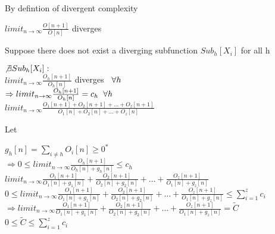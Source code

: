 \documentclass[11pt]{article}
\begin{document}
\vspace{8mm}
By defintion of divergent complexity
\begin{center}
\vspace{1mm}
$
limit_{n \rightarrow \infty} \frac{O[n+1]}{O[n]}$  diverges
\end{center}
\vspace{6mm}
Suppose there does not exist a diverging subfunction $Sub_h[X_i]$ for all h
\begin{center}
$
\not \exists Sub_h[X_i]:
$
\\ \vspace{2mm}
$
limit_{n \rightarrow \infty} \frac{O_h[n+1]}{O_h[n]}$ diverges $\hspace{2mm} \forall h$
\\ \vspace{2mm}
$
\Rightarrow limit_{n \rightarrow \infty} \frac{O_h[n+1]}{O_h[n]} = c_h \hspace{2mm} \forall h
$
\\ \vspace{2mm}
$
limit_{n \rightarrow \infty} \frac{O_{1}[n+1] + O_{2}[n+1] + ... + O_{z}[n+1]}{O_{1}[n] + O_{2}[n] + ... + O_{z}[n]}
$
\end{center}
\vspace{4mm}
Let
\begin{center}
$
g_h[n] = \sum_{i \neq h} O_i[n] \geq 0^*
$
\\ \vspace{2mm}
$
\Rightarrow0 \leq limit_{n \rightarrow \infty} \frac{O_h[n+1]}{O_h[n] + g_h[n]} \leq c_h
$
\\ \vspace{2mm}
$
limit_{n \rightarrow \infty} \frac{O_{1}[n+1]}{O_1[n] + g_1[n]} + \frac{O_{2}[n+1]}{O_2[n] + g_2[n]} +  ... + \frac{O_{z}[n+1]}{O_{1}[n] + g_z[n]}
$
\\ \vspace{2mm}
$
0 \leq limit_{n \rightarrow \infty} \frac{O_{1}[n+1]}{O_1[n] + g_1[n]} + \frac{O_{2}[n+1]}{O_2[n] + g_2[n]} +  ... + \frac{O_{z}[n+1]}{O_{1}[n] + g_z[n]} \leq \sum_{i=1}^{z} c_i
$
\\ \vspace{2mm}
$
\Rightarrow limit_{n \rightarrow \infty} \frac{O_{1}[n+1]}{O_1[n] + g_1[n]} + \frac{O_{2}[n+1]}{O_2[n] + g_2[n]} +  ... + \frac{O_{z}[n+1]}{O_{1}[n] + g_z[n]} = \tilde{C}
$
\\ \vspace{2mm}
$
0 \leq \tilde{C} \leq \sum_{i=1}^{z} c_i
$
\end{center}
\vspace{2mm}
\end{document}

